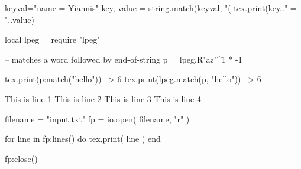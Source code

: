 \documentclass{article}
\begin{document}
\begin{luacode*}
keyval="name = Yiannis"
key, value = string.match(keyval, "(%
tex.print(key.." = "..value)
\end{luacode*}

\begin{luacode*}
local lpeg = require "lpeg"

-- matches a word followed by end-of-string
p = lpeg.R"az"^1 * -1

tex.print(p:match("hello"))        --> 6
tex.print(lpeg.match(p, "hello"))  --> 6

\end{luacode*}

\begin{filecontents*}
This is line 1
This is line 2
This is line 3
This is line 4
\end{filecontents*}
\begin{luacode*}
filename = "input.txt"
fp = io.open( filename, "r" )
 
for line in fp:lines() do
    tex.print( line )
end
 
fp:close()
\end{luacode*}
\end{document}
